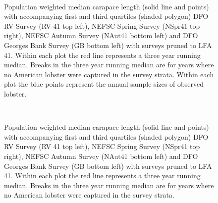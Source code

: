 \documentclass[11pt]{article}
\newcommand{\D}{.}
\newcommand{\e}{/backup/bio_data/bio.lobster/figures/} %
\begin{document}
\begin{figure}
\centering
{}
\\

\caption{Population weighted median carapace length (solid line and points) with accompanying first and third quartiles (shaded polygon) DFO RV Survey (RV 41 top left), NEFSC Spring Survey (NSpr41 top right), NEFSC Autumn Survey (NAut41 bottom left) and DFO Georges Bank Survey (GB bottom left) with surveys pruned to LFA 41. Within each plot the red line represents a three year running median. Breaks in the three year running median are for years where no American lobster were captured in the survey strata. Within each plot the blue points represent the annual sample sizes of observed lobster.}
\end{figure}
\clearpage




\begin{figure}
\centering
{}
\\

\caption{Population weighted median carapace length (solid line and points) with accompanying first and third quartiles (shaded polygon) DFO RV Survey (RV 41 top left), NEFSC Spring Survey (NSpr41 top right), NEFSC Autumn Survey (NAut41 bottom left) and DFO Georges Bank Survey (GB bottom left) with surveys pruned to LFA 41. Within each plot the red line represents a three year running median. Breaks in the three year running median are for years where no American lobster were captured in the survey strata. }
\end{figure}
\clearpage

\end{document}
